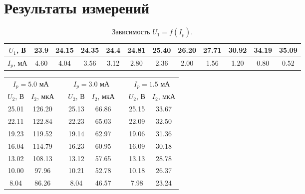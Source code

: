 \documentclass[a4paper,12pt]{article}
\begin{document}
\section*{Результаты измерений}
\begin{table}[h]
\centering
\begin{tabular}{|c|c|c|c|c|c|c|c|c|c|c|c|}
\hline
$U_1$, В & 23.9 & 24.15 & 24.35 & 24.4 & 24.81 & 25.40 & 26.20 & 27.71 & 30.92 & 34.19 & 35.09 \\ \hline
$I_p$, мА & 4.60 & 4.04  & 3.56  & 3.12 & 2.80  & 2.36  & 2.00  & 1.56  & 1.20  & 0.80  & 0.52  \\ \hline
\end{tabular}
\caption{Зависимость $U_1 = f(I_p)$.}
\end{table}


\begin{table}[h]
\centering
\begin{tabular}{|c|c|c|c|c|c|c|c|}
\cline{1-2} \cline{4-5} \cline{7-8}
\multicolumn{2}{|c|}{$I_p = 5.0$ мА} &  & \multicolumn{2}{c|}{$I_p = 3.0$ мА} &  & \multicolumn{2}{c|}{$I_p = 1.5$ мА} \\ \cline{1-2} \cline{4-5} \cline{7-8} 
$U_2$, В          & $I_2$, мкА        &  & $U_2$, В         & $I_2$, мкА        &  & $U_2$, В          & $I_2$, мкА         \\ \cline{1-2} \cline{4-5} \cline{7-8} 
25.01          & 126.20          &  & 25.13         & 66.86          &  & 25.15          & 33.67           \\ \cline{1-2} \cline{4-5} \cline{7-8} 
22.11          & 122.84         &  & 22.23         & 65.03          &  & 22.09          & 32.50           \\ \cline{1-2} \cline{4-5} \cline{7-8} 
19.23          & 119.52         &  & 19.14         & 62.97          &  & 19.06          & 31.36           \\ \cline{1-2} \cline{4-5} \cline{7-8} 
16.04          & 114.79         &  & 16.23         & 60.95          &  & 16.09          & 30.18           \\ \cline{1-2} \cline{4-5} \cline{7-8} 
13.02          & 108.13         &  & 13.12         & 57.65          &  & 13.13          & 28.78           \\ \cline{1-2} \cline{4-5} \cline{7-8} 
10.00          & 97.96          &  & 10.21         & 52.78          &  & 10.18          & 26.37           \\ \cline{1-2} \cline{4-5} \cline{7-8} 
8.04           & 86.26          &  & 8.04          & 46.57          &  & 7.98           & 23.24           \\ \cline{1-2} \cline{4-5} \cline{7-8} 

\end{tabular}
\end{table}
\end{document}
